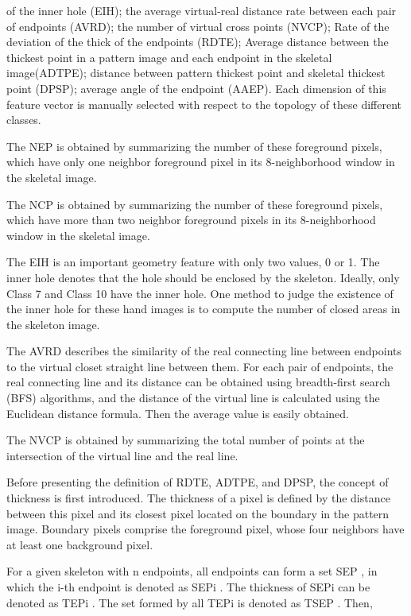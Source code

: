 \documentclass[10pt, a4paper]{article}
\begin{document}
\begin{multicols}{2}
of the inner hole (EIH); the average virtual-real distance
rate between each pair of endpoints (AVRD); the number
of virtual cross points (NVCP); Rate of the deviation
of the thick of the endpoints (RDTE); Average distance
between the thickest point in a pattern image and each
endpoint in the skeletal image(ADTPE); distance between pattern thickest point and skeletal thickest point
(DPSP); average angle of the endpoint (AAEP). Each
dimension of this feature vector is manually selected with
respect to the topology of these different classes.
\par
The NEP is obtained by summarizing the number of
these foreground pixels, which have only one neighbor
foreground pixel in its 8-neighborhood window in the
skeletal image.
\par
The NCP is obtained by summarizing the number
of these foreground pixels, which have more than two
neighbor foreground pixels in its 8-neighborhood window in the skeletal image.
\par The EIH is an important geometry feature with only
two values, 0 or 1. The inner hole denotes that the hole
should be enclosed by the skeleton. Ideally, only Class 7
and Class 10 have the inner hole. One method to judge
the existence of the inner hole for these hand images is
to compute the number of closed areas in the skeleton
image.
\par
The AVRD describes the similarity of the real connecting line between endpoints to the virtual closet straight
line between them. For each pair of endpoints, the real
connecting line and its distance can be obtained using
breadth-first search (BFS) algorithms, and the distance of
the virtual line is calculated using the Euclidean distance
formula. Then the average value is easily obtained.
\par The NVCP is obtained by summarizing the total
number of points at the intersection of the virtual line
and the real line.
\par
Before presenting the definition of RDTE, ADTPE,
and DPSP, the concept of thickness is first introduced.
The thickness of a pixel is defined by the distance
between this pixel and its closest pixel located on the
boundary in the pattern image. Boundary pixels comprise
the foreground pixel, whose four neighbors have at least
one background pixel.
\par
For a given skeleton with n endpoints, all endpoints
can form a set SEP , in which the i-th endpoint is denoted
as SEPi
. The thickness of SEPi
can be denoted as TEPi
.
The set formed by all TEPi
is denoted as TSEP . Then,

\end{multicols}
\end{document}

